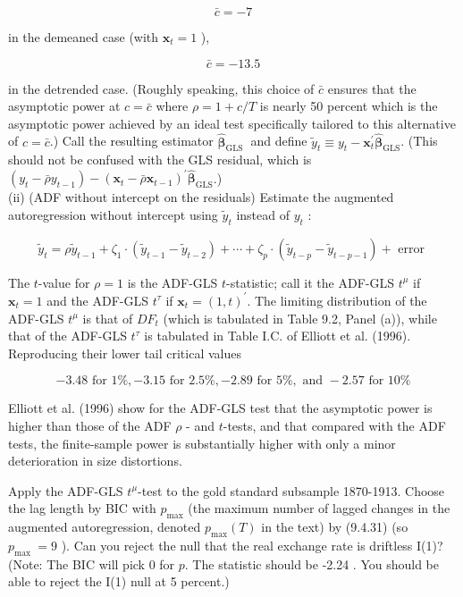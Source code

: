 \documentclass[10pt]{article}
\begin{document}
$$
\bar{c}=-7
$$

in the demeaned case (with $\mathbf{x}_{t}=1$ ),

$$
\bar{c}=-13.5
$$

in the detrended case. (Roughly speaking, this choice of $\bar{c}$ ensures that the asymptotic power at $c=\bar{c}$ where $\rho=1+c / T$ is nearly 50 percent which is the asymptotic power achieved by an ideal test specifically tailored to this alternative of $c=\bar{c}$.) Call the resulting estimator $\widehat{\boldsymbol{\beta}}_{\text {GLS }}$ and define $\tilde{y}_{t} \equiv y_{t}-\mathbf{x}_{t}^{\prime} \widehat{\boldsymbol{\beta}}_{\mathrm{GLS}}$. (This should not be confused with the GLS residual, which is $\left(y_{t}-\bar{\rho} y_{t-1}\right)-\left(\mathbf{x}_{t}-\bar{\rho} \mathbf{x}_{t-1}\right)^{\prime} \widehat{\boldsymbol{\beta}}_{\mathrm{GLS}}$.)\\
(ii) (ADF without intercept on the residuals) Estimate the augmented autoregression without intercept using $\tilde{y}_{t}$ instead of $y_{t}$ :

$$
\tilde{y}_{t}=\rho \tilde{y}_{t-1}+\zeta_{1} \cdot\left(\tilde{y}_{t-1}-\tilde{y}_{t-2}\right)+\cdots+\zeta_{p} \cdot\left(\tilde{y}_{t-p}-\tilde{y}_{t-p-1}\right)+\text { error }
$$

The $t$-value for $\rho=1$ is the ADF-GLS $t$-statistic; call it the ADF-GLS $t^{\mu}$ if $\mathbf{x}_{t}=1$ and the ADF-GLS $t^{\tau}$ if $\mathbf{x}_{t}=(1, t)^{\prime}$. The limiting distribution of the ADF-GLS $t^{\mu}$ is that of $D F_{t}$ (which is tabulated in Table 9.2, Panel (a)), while that of the ADF-GLS $t^{\tau}$ is tabulated in Table I.C. of Elliott et al. (1996). Reproducing their lower tail critical values

$$
-3.48 \text { for } 1 \%,-3.15 \text { for } 2.5 \%,-2.89 \text { for } 5 \%, \text { and }-2.57 \text { for } 10 \%
$$

Elliott et al. (1996) show for the ADF-GLS test that the asymptotic power is higher than those of the ADF $\rho$ - and $t$-tests, and that compared with the ADF tests, the finite-sample power is substantially higher with only a minor deterioration in size distortions.

Apply the ADF-GLS $t^{\mu}$-test to the gold standard subsample 1870-1913. Choose the lag length by BIC with $p_{\max }$ (the maximum number of lagged changes in the augmented autoregression, denoted $p_{\max }(T)$ in the text) by (9.4.31) (so $p_{\text {max }}=9$ ). Can you reject the null that the real exchange rate is driftless I(1)? (Note: The BIC will pick 0 for $p$. The statistic should be -2.24 . You should be able to reject the I(1) null at 5 percent.)
\end{document}
